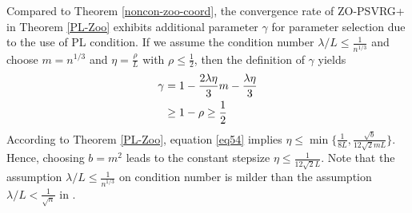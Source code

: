 \begin{remark}
Compared to Theorem \ref{noncon-zoo-coord}, the convergence rate of ZO-PSVRG+ in Theorem \ref{PL-Zoo} exhibits additional parameter $\gamma$ for parameter selection due to the use of PL condition. 
If we assume the condition number $\lambda/L\leq \frac{1}{n^{1/3}}$ and choose $m = n^{1/3}$ and $\eta = \frac{\rho}{L}$ with $\rho\leq \frac{1}{2}$, then the definition of $\gamma$ yields  
\begin{align}
\gamma &= 1-\frac{2\lambda\eta}{3} m-\frac{\lambda\eta}{3}\notag \\
& \geq  1 - \rho \geq \frac{1}{2}\label{eq54}
\end{align}
According to Theorem \ref{PL-Zoo}, equation \eqref{eq54} implies $\eta \leq \min\{\frac{1}{8L}, \frac{\sqrt{b}}{12\sqrt{2} m L }\}$. 
Hence, choosing $b = m^{2}$ leads to the constant stepsize  $\eta \leq \frac{1}{12\sqrt{2} L}$.
Note that the assumption $\lambda/L \leq \frac{1}{{n}^{1/3}}$ on condition number is milder than the assumption $\lambda/L < \frac{1}{\sqrt{n}}$ in \cite{reddi2016proximal}.
\end{remark}
